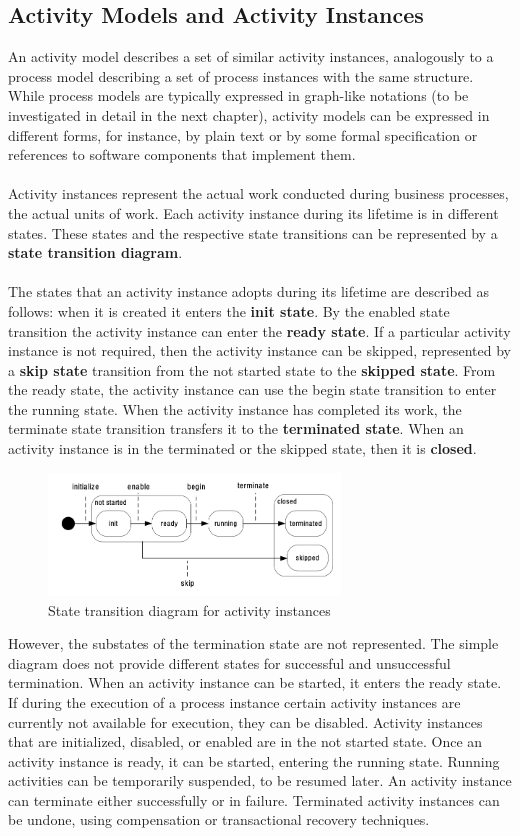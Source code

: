 \documentclass[10pt,a4paper]{article}
\begin{document}
\subsection{Activity Models and Activity Instances}
An activity model describes a set of similar activity instances, analogously to a process model describing a set of process instances with the same structure. While process models are typically expressed in graph-like notations (to be investigated in detail in the next chapter), activity models can be expressed in different forms, for instance, by plain text or by some formal specification or references to software components that implement them. \\ \\
Activity instances represent the actual work conducted during business processes, the actual units of work. Each activity instance during its lifetime is in different states. These states and the respective state transitions can be represented by a \textbf{state transition diagram}. \\ \\
The states that an activity instance adopts during its lifetime are described as follows: when it is created it enters the \textbf{init state}. By the enabled state transition the activity instance can enter the \textbf{ready state}. If a particular activity instance is not required, then the activity instance can be skipped, represented by a \textbf{skip state} transition from the not started state to the \textbf{skipped state}. From the ready state, the activity instance can use the begin state transition to enter the running state. When the activity instance has completed its work, the terminate state transition transfers it to the \textbf{terminated state}. When an activity instance is in the terminated or the skipped state, then it is \textbf{closed}.
\begin{figure}[ht!]
 \hfill \includegraphics[width=220pt]{images/activity-model}\hspace*{\fill}
 \caption{State transition diagram for activity instances}
  \label{fig:activity-models}
\end{figure}
However, the substates of the termination state are not represented. The simple diagram does not provide different states for successful and unsuccessful termination. When an activity instance can be started, it enters the ready state. If during the execution of a process instance certain activity instances are currently not available for execution, they can be disabled. Activity instances that are initialized, disabled, or enabled are in the not started state. Once an activity instance is ready, it can be started, entering the running state. Running activities can be temporarily suspended, to be resumed later. An activity instance can terminate either successfully or in failure. Terminated activity instances can be undone, using compensation or transactional recovery techniques.
\end{document}
